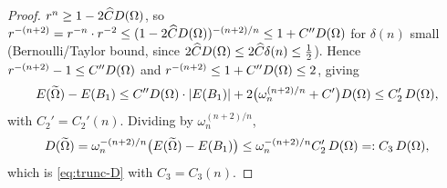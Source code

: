 \begin{proof}
$r^{n}\ge1-2\widehat C D(\Omega)$, so
$r^{-(n+2)}=r^{-n}\cdot r^{-2}\le(1-2\widehat C D(\Omega))^{-(n+2)/n}
\le1+C''D(\Omega)$ for $\delta(n)$ small (Bernoulli/Taylor bound, since
$2\widehat C D(\Omega)\le2\widehat C\delta(n)\le\tfrac12$). Hence
$r^{-(n+2)}-1\le C''D(\Omega)$ and $r^{-(n+2)}\le1+C''D(\Omega)\le2$, giving
\[
   E(\widetilde{\Omega})-E(B_1)
   \le C''D(\Omega)\cdot\left|E(B_1)\right|+2\bigl(\omega_n^{(n+2)/n}+C'\bigr)D(\Omega)
   \le C_2'\,D(\Omega),
\]
with $C_2'=C_2'(n)$.
Dividing by $\omega_n^{(n+2)/n}$,
\begin{equation}\label{eq:D-tilde}
   D(\widetilde{\Omega})=\omega_n^{-(n+2)/n}\bigl(E(\widetilde{\Omega})-E(B_1)\bigr)
   \le\omega_n^{-(n+2)/n}C_2'\,D(\Omega)=:C_3\,D(\Omega),
\end{equation}
which is \eqref{eq:trunc-D} with $C_3=C_3(n)$.


\end{proof}
